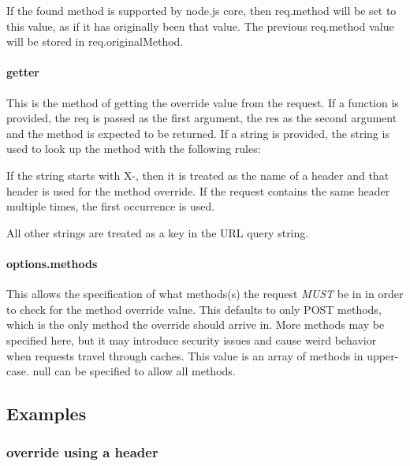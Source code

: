 If the found method is supported by node.\+js core, then {\ttfamily req.\+method} will be set to this value, as if it has originally been that value. The previous {\ttfamily req.\+method} value will be stored in {\ttfamily req.\+original\+Method}.

\paragraph*{getter}

This is the method of getting the override value from the request. If a function is provided, the {\ttfamily req} is passed as the first argument, the {\ttfamily res} as the second argument and the method is expected to be returned. If a string is provided, the string is used to look up the method with the following rules\+:


\begin{DoxyItemize}
\item If the string starts with {\ttfamily X-\/}, then it is treated as the name of a header and that header is used for the method override. If the request contains the same header multiple times, the first occurrence is used.
\item All other strings are treated as a key in the U\+RL query string.
\end{DoxyItemize}

\paragraph*{options.\+methods}

This allows the specification of what methods(s) the request {\itshape M\+U\+ST} be in in order to check for the method override value. This defaults to only {\ttfamily P\+O\+ST} methods, which is the only method the override should arrive in. More methods may be specified here, but it may introduce security issues and cause weird behavior when requests travel through caches. This value is an array of methods in upper-\/case. {\ttfamily null} can be specified to allow all methods.

\subsection*{Examples}

\subsubsection*{override using a header}

